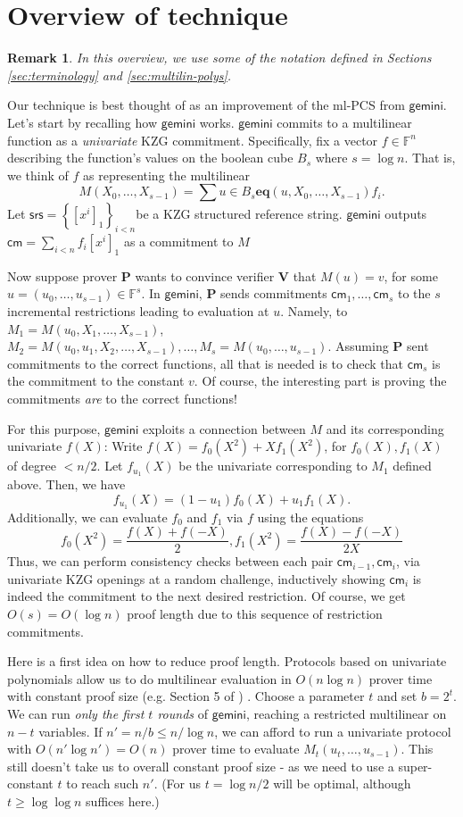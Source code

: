 \documentclass[11pt]{article} %
\newcommand{\gemini}{\ensuremath{\mathsf{gemini}}\xspace}
\newcommand{\F}{\ensuremath{\mathbb F}\xspace}
\newcommand{\srs}{\ensuremath{\mathsf{srs}}\xspace}
\newcommand{\cm}{\ensuremath{\mathsf{cm}}\xspace}
\newcommand{\sett}[2]{\ensuremath{\set{#1}_{#2}}\xspace}
\newcommand{\enc}[1]{\ensuremath{\left[#1\right]_1}\xspace}
\newcommand{\prv}{\ensuremath{\mathsf{\mathbf{P}}}\xspace}
\newcommand{\ver}{\ensuremath{\mathsf{\mathbf{V}}}\xspace}
\newcommand{\set}[1]{\ensuremath{\left\{#1\right\}}\xspace}
\newcommand{\sumi}[1]{\sum_{i< #1}}
\newtheorem{remark}[lemma]{Remark}
\newcommand{\eq}{\ensuremath{\mathsf{eq}}\xspace}
\renewcommand{\eq}{\ensuremath{\mathbf{eq}}\xspace}
\newcommand{\B}[1]{\ensuremath{B_{#1}}\xspace}
\newcommand{\mlpcs}{ml-PCS\xspace}
\begin{document}
\section{Overview of technique}
\begin{remark}
 In this overview, we use some of the notation defined in Sections \ref{sec:terminology} and \ref{sec:multilin-polys}.
\end{remark}

Our technique is best thought of as an improvement of the \mlpcs from \gemini \cite{gemini}.
Let's start by recalling how \gemini works.
\gemini commits to a multilinear function as a \emph{univariate} KZG commitment\cite{kzg}. Specifically,
fix a vector $f\in \F^n$ describing the function's values on the boolean cube \B{s} where $s=\log n$. That is, we think of $f$ as representing the 
multilinear
\[M(X_0,\ldots,X_{s-1})= \sum{u\in \B{s}}\eq(u,X_0,\ldots,X_{s-1}) f_i.\]
Let $\srs =\sett{\enc{x^i}}{i<n}$be a KZG structured reference string.
 \gemini outputs $\cm=\sumi{n}f_i \enc{x^i}$ as a commitment to $M$  


Now suppose prover \prv wants to convince verifier \ver  that $M(u)=v$, for some $u=(u_0,\ldots,u_{s-1})\in \F^s$. In \gemini, \prv sends commitments $\cm_1,\ldots,\cm_s$ to the $s$ incremental restrictions leading  to evaluation at $u$.
Namely, to $M_1=M(u_0,X_1,\ldots,X_{s-1})$, $M_2=M(u_0,u_1,X_2,\ldots,X_{s-1}),\ldots,M_s=M(u_0,\ldots,u_{s-1})$.
Assuming \prv sent commitments to the correct functions, all that is needed is to check that $\cm_s$ is the commitment to the constant $v$. Of course, the interesting part is proving the commitments \emph{are} to the correct functions!

For this purpose, \gemini exploits a connection between $M$ and its corresponding univariate $f(X)$:
Write $f(X)=f_0(X^2)+X f_1(X^2)$, for $f_0(X),f_1(X)$ of degree $<n/2$. Let $f_{u_1}(X)$ be the univariate corresponding to $M_1$ defined above. Then, we have
\[f_{u_1}(X)=(1-u_1)f_0(X)+ u_1 f_1(X).\]
Additionally, we can evaluate $f_0$ and $f_1$ via $f$  using the equations
\[f_0(X^2)=\frac{f(X)+f(-X)}{2}, f_1(X^2)=\frac{f(X)-f(-X)}{2X}\]
Thus, we can perform consistency checks between each pair $\cm_{i-1},\cm_i$, via univariate KZG openings at a random challenge, inductively showing $\cm_i$ is indeed the commitment to the next desired restriction.
Of course, we get $O(s)=O(\log n)$ proof length due to this sequence of restriction commitments.

Here is a first idea on how to reduce proof length.
Protocols based on univariate polynomials allow us to do multilinear evaluation in $O(n\log n)$ prover time with constant proof size (e.g. Section 5 of \cite{logupgkr}) .
Choose a parameter $t$ and set $b=2^t$.
We can run \emph{only the first $t$ rounds} of \gemini, reaching a restricted multilinear on $n-t$ variables.
If $n'=n/b\leq n/\log n$, we can afford to run a univariate protocol with $O(n' \log n')=O(n)$ prover time to evaluate $M_t(u_t,\ldots,u_{s-1})$.
This still doesn't take us to overall constant proof size - as we  need to use a super-constant $t$ to reach such $n'$. (For us $t=\log n/2$ will be optimal, although $t\geq \log \log n$ suffices here.)
\end{document}
